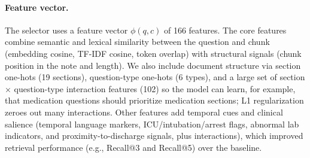 \paragraph{Feature vector.}
The selector uses a feature vector $\phi(q,c)$ of 166 features. The core features combine semantic and lexical similarity between the question and chunk (embedding cosine, TF-IDF cosine, token overlap) with structural signals (chunk position in the note and length). We also include document structure via section one-hots (19 sections), question-type one-hots (6 types), and a large set of section × question-type interaction features (102) so the model can learn, for example, that medication questions should prioritize medication sections; L1 regularization zeroes out many interactions. Other features add temporal cues and clinical salience (temporal language markers, ICU/intubation/arrest flags, abnormal lab indicators, and proximity-to-discharge signals, plus interactions), which improved retrieval performance (e.g., Recall@3 and Recall@5) over the baseline.
